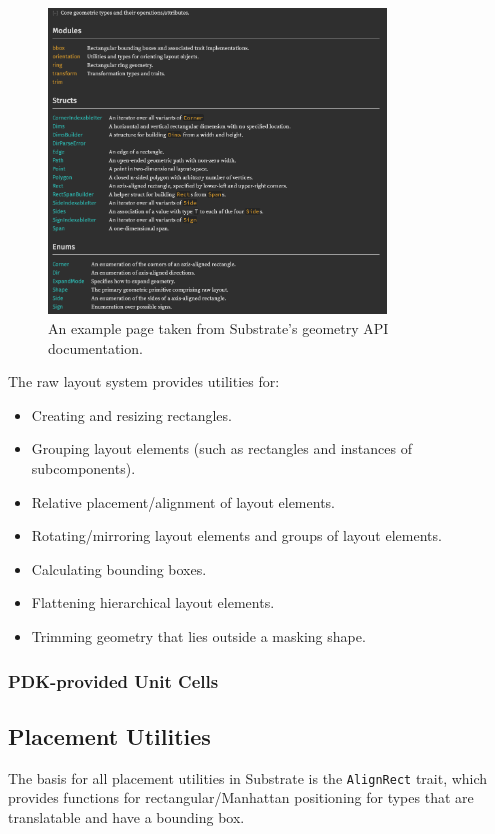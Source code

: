 \begin{figure}[htb] \centering
\includegraphics[width=0.8\textwidth]{figures/subgeom.png}
\caption{
    An example page taken from Substrate's geometry API documentation.
}
\end{figure}


The raw layout system provides utilities for:
\begin{itemize}
\item Creating and resizing rectangles.
\item Grouping layout elements (such as rectangles and instances of subcomponents).
\item Relative placement/alignment of layout elements.
\item Rotating/mirroring layout elements and groups of layout elements.
\item Calculating bounding boxes.
\item Flattening hierarchical layout elements.
\item Trimming geometry that lies outside a masking shape.
\end{itemize}

\subsubsection{PDK-provided Unit Cells}

\subsection{Placement Utilities} \label{sec:placement-utilities}

The basis for all placement utilities in Substrate is the \verb|AlignRect| trait,
which provides functions for rectangular/Manhattan positioning for types
that are translatable and have a bounding box.

